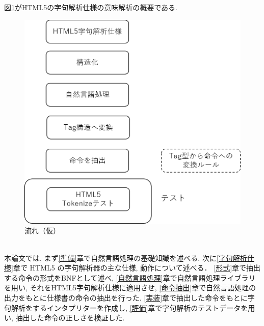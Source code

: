 \documentclass[uplatex,a4j]{jsreport}
\begin{document}
図\ref{流れ}がHTML5の字句解析仕様の意味解析の概要である.\\
\begin{figure}[h]
    \centering
    \includegraphics[keepaspectratio, scale=0.6]
         {figure/流れ.png}
    \caption{流れ（仮）}
    \label{流れ}
\end{figure}
\\
本論文では, まず\ref{準備}章で自然言語処理の基礎知識を述べる.
次に\ref{字句解析仕様}章で HTML5 の字句解析器の主な仕様, 動作について述べる．
\ref{形式}章で抽出する命令の形式をBNFとして述べ, 
\ref{自然言語処理}章で自然言語処理ライブラリを用い, それをHTML5字句解析仕様に適用させ, 
\ref{命令抽出}章で自然言語処理の出力をもとに仕様書の命令の抽出を行った. 
\ref{実装}章で抽出した命令をもとに字句解析をするインタプリターを作成し, 
\ref{評価}章で字句解析のテストデータを用い, 抽出した命令の正しさを検証した.
\end{document}

